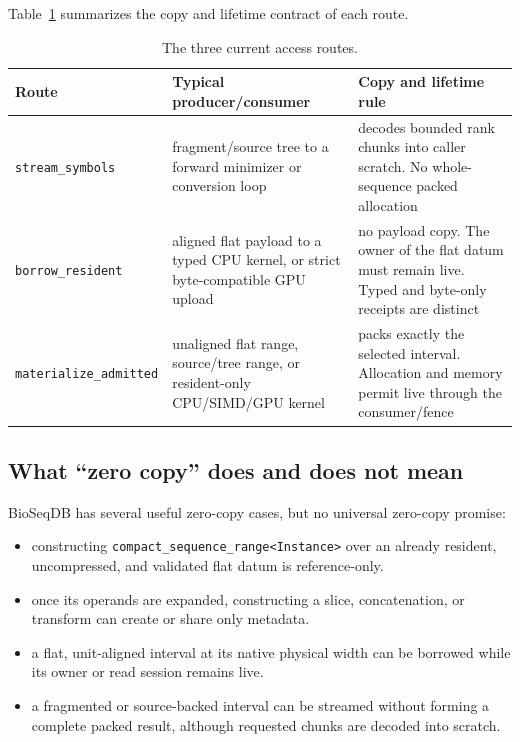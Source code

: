 Table~\ref{tab:lazy-access-routes} summarizes the copy and lifetime contract of
each route.

\begin{table}[ht]
\centering
\caption{The three current access routes.}
\label{tab:lazy-access-routes}
\begin{tabularx}{\textwidth}{
  >{\raggedright\arraybackslash}p{}
  >{\raggedright\arraybackslash}p{}
  >{\raggedright\arraybackslash}X}
\textbf{Route} & \textbf{Typical producer/consumer} &
\textbf{Copy and lifetime rule}\\
\hline
\texttt{stream\_\allowbreak symbols} &
fragment/source tree to a forward minimizer or
conversion loop & decodes bounded rank chunks into caller scratch.  No
whole-sequence packed allocation\\
\texttt{borrow\_\allowbreak resident} &
aligned flat payload to a typed CPU kernel, or
strict byte-compatible GPU upload & no payload copy.  The owner of the flat
datum must remain live.  Typed and byte-only receipts are distinct\\
\texttt{materialize\_\allowbreak admitted} &
unaligned flat range, source/tree range, or
resident-only CPU/SIMD/GPU kernel & packs exactly the selected interval.
Allocation and memory permit live through the consumer/fence\\
\end{tabularx}
\end{table}

\subsection{What ``zero copy'' does and does not mean}

\mbox{BioSeqDB} has several useful zero-copy cases, but no universal zero-copy
promise:

\begin{itemize}
    \item constructing \texttt{compact\_sequence\_range<Instance>} over an
    already resident, uncompressed, and validated flat datum is reference-only.
    \item once its operands are expanded, constructing a slice, concatenation,
    or transform can create or share only metadata.
    \item a flat, unit-aligned interval at its native physical width can be
    borrowed while its owner or read session remains live.
    \item a fragmented or source-backed interval can be streamed
    without forming a complete packed result, although requested chunks are
    decoded into scratch.
\end{itemize}

